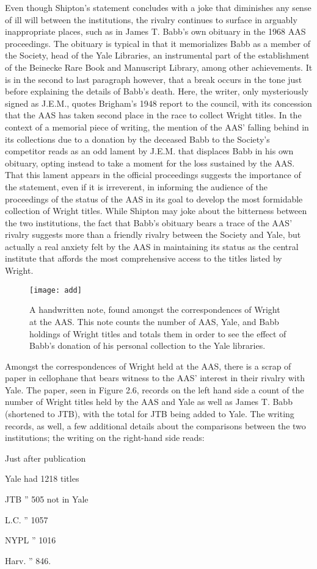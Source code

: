 Even though Shipton's statement concludes with a joke that diminishes any sense of ill will between the institutions, the rivalry continues to surface in arguably inappropriate places, such as in James T. Babb's own obituary in the 1968 AAS proceedings. The obituary is typical in that it memorializes Babb as a member of the Society, head of the Yale Libraries, an instrumental part of the establishment of the Beinecke Rare Book and Manuscript Library, among other achievements. It is in the second to last paragraph however, that a break occurs in the tone just before explaining the details of Babb's death. Here, the writer, only mysteriously signed as J.E.M., quotes Brigham's 1948 report to the council, with its concession that the AAS has taken second place in the race to collect Wright titles.\autocite[230]{j.e.m._james_1968} In the context of a memorial piece of writing, the mention of the AAS' falling behind in its collections due to a donation by the deceased Babb to the Society's competitor reads as an odd lament by J.E.M. that displaces Babb in his own obituary, opting instead to take a moment for the loss sustained by the AAS. That this lament appears in the official proceedings suggests the importance of the statement, even if it is irreverent, in informing the audience of the proceedings of the status of the AAS in its goal to develop the most formidable collection of Wright titles. While Shipton may joke about the bitterness between the two institutions, the fact that Babb's obituary bears a trace of the AAS' rivalry suggests more than a friendly rivalry between the Society and Yale, but actually a real anxiety felt by the AAS in maintaining its status as the central institute that affords the most comprehensive access to the titles listed by Wright.

\begin{figure}
\texttt{[image: add]}
\caption{A handwritten note, found amongst the correspondences of Wright at the AAS. This note counts the number of AAS, Yale, and Babb holdings of Wright titles and totals them in order to see the effect of Babb's donation of his personal collection to the Yale libraries.}
\end{figure}

Amongst the correspondences of Wright held at the AAS, there is a scrap of paper in cellophane that bears witness to the AAS' interest in their rivalry with Yale. The paper, seen in Figure 2.6, records on the left hand side a count of the number of Wright titles held by the AAS and Yale as well as James T. Babb (shortened to JTB), with the total for JTB being added to Yale. The writing records, as well, a few additional details about the comparisons between the two institutions; the writing on the right-hand side reads:
\begin{displayquote}
Just after publication 

Yale had 1218 titles 

JTB '' 505 not in Yale 

L.C. '' 1057 

NYPL '' 1016 

Harv. '' 846.
\end{displayquote}

